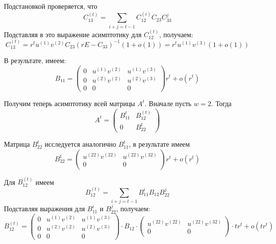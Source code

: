 \documentclass[11pt]{article}
\begin{document}
Подстановкой проверяется, что
\begin{equation}
    C_{13}^{(t)} = \sum_{i + j = t-1} C_{12}^{(i)} C_{23} C_{33}^j
\end{equation}
Подставляя в это выражение асимптотику для $C_{12}^{(t)}$, получаем:
\begin{equation}
    C_{13}^{(t)} = r^t u^{(1)} v^{(2)} C_{23} (rE - C_{33})^{-1} (1 + o(1)) = r^t u^{(1)} v^{(3)} (1 + o(1))
\end{equation}

В результате, имеем:
\begin{equation}
    B_{11} = 
    \begin{pmatrix}
        0 & u^{(1)} v^{(2)} & u^{(1)} v^{(3)} \\
        0 & u^{(2)} v^{(2)} & u^{(2)} v^{(3)} \\
        0 & 0 & 0
    \end{pmatrix}
    r^t + o(r^t)
\end{equation}

Получим теперь асимптотику всей матрицы $A^t$. Вначале пусть $w = 2$. Тогда
\begin{equation}
    A^t = 
    \begin{pmatrix}
        B_{11}^t & B_{12}^{(t)} \\
        0 & B_{22}^t
    \end{pmatrix}
\end{equation}

Матрица $B_{22}^t$ исследуется аналогично $B_{11}^t$, в результате имеем
\begin{equation}
    B_{22}^t = 
    \begin{pmatrix}
        u^{(22)} v^{(22)} & u^{(22)} v^{(32)} \\
        0 & 0
    \end{pmatrix}
    r^t + o(r^t)
\end{equation}

Для $B_{12}^{(t)}$ имеем
\begin{equation}
    B_{12}^{(t)} = \sum_{i + j = t-1} B_{11}^i B_{12} B_{22}^j
\end{equation}
Подставляя выражения для $B_{11}^i$ и $B_{22}^j$, получаем:
\begin{equation}
    B_{12}^{(t)} = 
    \begin{pmatrix}
        0 & u^{(1)} v^{(2)} & u^{(1)} v^{(3)} \\
        0 & u^{(2)} v^{(2)} & u^{(2)} v^{(3)} \\
        0 & 0 & 0
    \end{pmatrix}
    \cdot B_{12} \cdot
    \begin{pmatrix}
        u^{(22)} v^{(22)} & u^{(22)} v^{(32)} \\
        0 & 0
    \end{pmatrix}
    \cdot t r^t + o(t r^t)
\end{equation}
\end{document}
